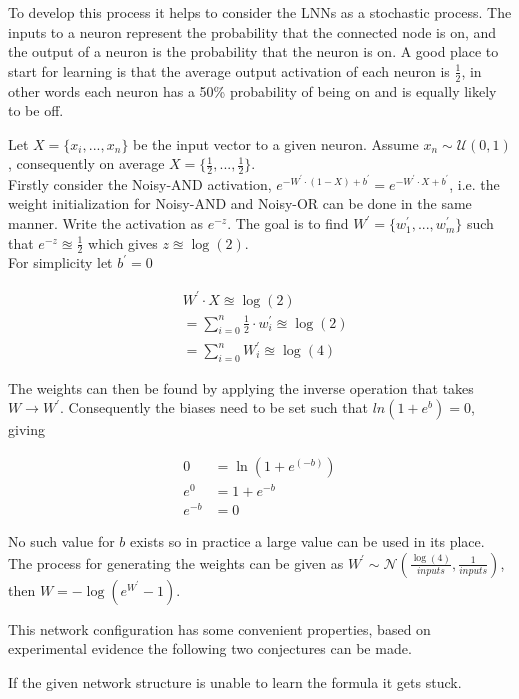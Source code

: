 To develop this process it helps to consider the LNNs as a stochastic process. The inputs to a neuron represent the probability that the connected node is on, and the output of a neuron is the probability that the neuron is on. A good place to start for learning is that the average output activation of each neuron is $\frac{1}{2}$, in other words each neuron has a 50\% probability of being on and is equally likely to be off.

Let $X = \{x_i, ..., x_n\}$ be the input vector to a given neuron. Assume $x_n \sim \mathcal{U}(0, 1)$, consequently on average $X = \{\frac{1}{2}, ..., \frac{1}{2}\}$.\\

Firstly consider the Noisy-AND activation, $e^{-W^{'} \cdot (1 - X) + b^{'}} = e^{-W^{'} \cdot X + b^{'}}$, i.e. the weight initialization for Noisy-AND and Noisy-OR can be done in the same manner. Write the activation as $e^{-z}$. The goal is to find $W^{'} = \{w_1^{'}, ..., w_m^{'}\}$ such that $e^{-z} \approxeq \frac{1}{2}$ which gives $z \approxeq \log(2)$.\\

For simplicity let $b^{'} = 0$

\begin{align*}
& W^{'} \cdot X \approxeq \log(2)\\
&= \sum_{i=0}^{n} \frac{1}{2} \cdot w^{'}_i \approxeq \log(2)\\
&= \sum_{i=0}^{n} W^{'}_i \approxeq \log(4)
\end{align*}

The weights can then be found by applying the inverse operation that takes $W \rightarrow W^{'}$. Consequently the biases need to be set such that $ln(1 + e^b) = 0$, giving

\begin{align*}
	0 &= \ln(1 + e^{(-b)})\\
	e^0 &= 1 + e^{-b}\\
	e^{-b} &= 0
\end{align*}

No such value for $b$ exists so in practice a large value can be used in its place. The process for generating the weights can be given as $W^{'} \sim \mathcal{N}(\frac{\log(4)}{inputs}, \frac{1}{inputs})$, then $W = -\log(e^{W^{'}} - 1)$.

This network configuration has some convenient properties, based on experimental evidence the following two conjectures can be made.


\begin{conjecture}
	If the given network structure is unable to learn the formula it gets stuck.
	\label{conjecture:lnn-stuck}
\end{conjecture}


